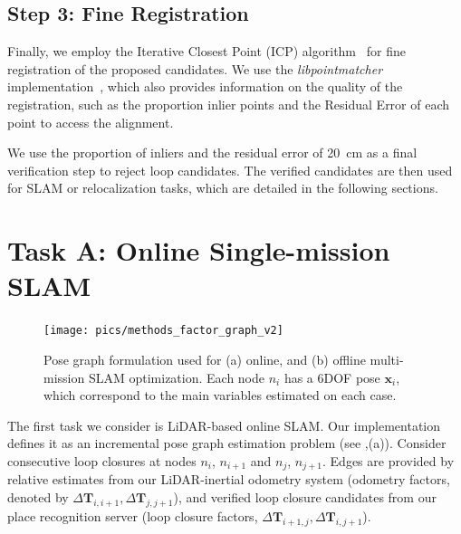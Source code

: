   





\subsection*{\textbf{Step 3: Fine Registration}}
\label{subsubsec:fine-registration}
Finally, we employ the Iterative Closest Point (ICP) algorithm~\cite{besl1992icp} for fine registration of the proposed candidates. We use the \emph{libpointmatcher} implementation~\cite{pomerleau2013iros}, which also provides information on the quality of the registration, such as the proportion inlier points and the Residual Error of each point to access the alignment.

We use the proportion of inliers and the residual error of \SI{20}{\centi\meter} as a final verification step to reject loop candidates. The verified candidates are then used for SLAM or relocalization tasks, which are detailed in the following sections.

\section{Task A: Online Single-mission SLAM} 
\label{sec:online_slam_mode}
\begin{figure}[t]
  \centering
  \texttt{[image: pics/methods\_factor\_graph\_v2]}
  \caption{Pose graph formulation used for (a) online, and (b) offline multi-mission SLAM optimization. Each node $n_{i}$ has a 6DOF pose $\mathbf{x}_{i}$, which correspond to the main variables estimated on each case.}
  \label{fig:factor_graph}
\end{figure}

The first task we consider is LiDAR-based online SLAM. Our implementation defines it as an incremental pose graph estimation problem (see ,(a)). Consider consecutive loop closures at nodes $n_{i}$, $n_{i+1}$ and $n_{j}$, $n_{j+1}$. Edges are provided by relative estimates from our LiDAR-inertial odometry system (odometry factors, denoted by $\Delta\mathbf{T}_{i,i+1}, \Delta\mathbf{T}_{j, j+1}$), and verified loop closure candidates from our place recognition server (loop closure factors, $\Delta\mathbf{T}_{i+1, j}, \Delta\mathbf{T}_{i, j+1}$).

